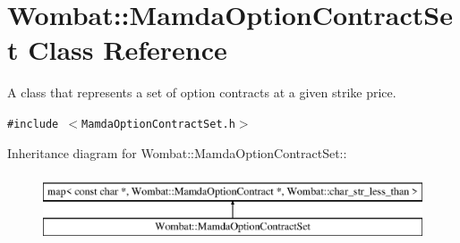 \hypertarget{classWombat_1_1MamdaOptionContractSet}{
\section{Wombat::Mamda\-Option\-Contract\-Set Class Reference}
\label{classWombat_1_1MamdaOptionContractSet}
}
A class that represents a set of option contracts at a given strike price.  


{\tt \#include $<$Mamda\-Option\-Contract\-Set.h$>$}

Inheritance diagram for Wombat::Mamda\-Option\-Contract\-Set::\begin{figure}[H]
\begin{center}
\leavevmode
\includegraphics[height=2cm]{classWombat_1_1MamdaOptionContractSet}
\end{center}
\end{figure}
